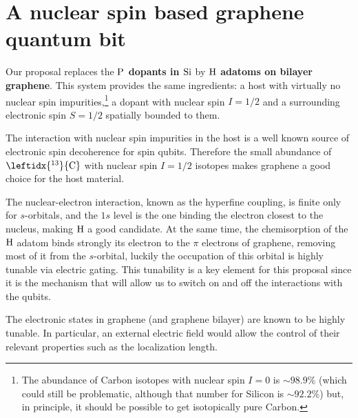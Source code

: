 \section{A nuclear spin based graphene quantum bit}
Our proposal replaces the \textbf{$\ce{P}$ dopants in $\ce{Si}$} by \textbf{$\ce{H}$ adatoms on bilayer graphene}.
This system provides the same ingredients: a host with virtually no nuclear spin impurities,\footnote{The abundance of Carbon isotopes with nuclear spin $I=0$ is $\sim98.9\%$ (which could still be problematic, although that number for Silicon is $\sim92.2\%$) but, in principle, it should be possible to get isotopically pure Carbon.} a dopant with nuclear spin $I=1/2$ and a surrounding electronic spin $S=1/2$ spatially bounded to them.


The interaction with nuclear spin impurities in the host is a well known source of electronic spin decoherence for spin qubits\cite{}. %
Therefore the small abundance of $\leftidx{^{13}}{\ce{C}}$ with nuclear spin $I=1/2$ isotopes makes graphene a good choice for the host material.

The nuclear-electron interaction, known as the hyperfine coupling, is finite only for $s$-orbitals, and the $1s$ level is the one binding the electron closest to the nucleus, making $\ce{H}$ a good candidate.
%
At the same time, the chemisorption of the $\ce{H}$ adatom binds strongly its electron to the $\pi$ electrons of graphene, removing most of it from the $s$-orbital, luckily the occupation of this orbital is highly tunable via electric gating. This tunability is a key element for this proposal since it is the mechanism that will allow us to switch on and off the interactions with the qubits.
\smallskip








The electronic states in graphene (and graphene bilayer) are known to be highly tunable. In particular, an external electric field would allow the control of their relevant properties such as the localization length.


